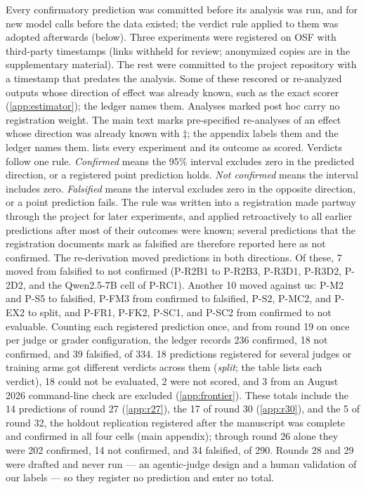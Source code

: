 Every confirmatory prediction was committed before its analysis was run, and for new model calls before the data existed; the verdict rule applied to them was adopted afterwards (below). Three experiments were registered on OSF with third-party timestamps\osf{} (links withheld for review; anonymized copies are in the supplementary material). The rest were committed to the project repository with a timestamp that predates the analysis\pre. Some of these rescored or re-analyzed outputs whose direction of effect was already known, such as the exact scorer (\cref{app:estimator}); the ledger names them. Analyses marked post hoc\ph{} carry no registration weight. The main text marks pre-specified re-analyses of an effect whose direction was already known with $\ddagger$; the appendix labels them \pre{} and the ledger names them.  lists every experiment and its outcome as scored. Verdicts follow one rule. \emph{Confirmed} means the 95\% interval excludes zero in the predicted direction, or a registered point prediction holds. \emph{Not confirmed} means the interval includes zero. \emph{Falsified} means the interval excludes zero in the opposite direction, or a point prediction fails. The rule was written into a registration made partway through the project for later experiments, and applied retroactively to all earlier predictions after most of their outcomes were known; several predictions that the registration documents mark as falsified are therefore reported here as not confirmed. The re-derivation moved predictions in both directions. Of these, 7 moved from falsified to not confirmed (P-R2B1 to P-R2B3, P-R3D1, P-R3D2, P-2D2, and the Qwen2.5-7B cell of P-RC1). Another 10 moved against us: P-M2 and P-S5 to falsified, P-FM3 from confirmed to falsified, P-S2, P-MC2, and P-EX2 to split, and P-FR1, P-FK2, P-SC1, and P-SC2 from confirmed to not evaluable. Counting each registered prediction once, and from round 19 on once per judge or grader configuration, the ledger records 236 confirmed, 18 not confirmed, and 39 falsified, of 334. 18 predictions registered for several judges or training arms got different verdicts across them (\emph{split}; the table lists each verdict), 18 could not be evaluated, 2 were not scored, and 3 from an August 2026 command-line check are excluded (\cref{app:frontier}). These totals include the 14 predictions of round 27 (\cref{app:r27}), the 17 of round 30 (\cref{app:r30}), and the 5 of round 32, the holdout replication registered after the manuscript was complete and confirmed in all four cells (main appendix); through round 26 alone they were 202 confirmed, 14 not confirmed, and 34 falsified, of 290. Rounds 28 and 29 were drafted and never run --- an agentic-judge design and a human validation of our labels --- so they register no prediction and enter no total.

